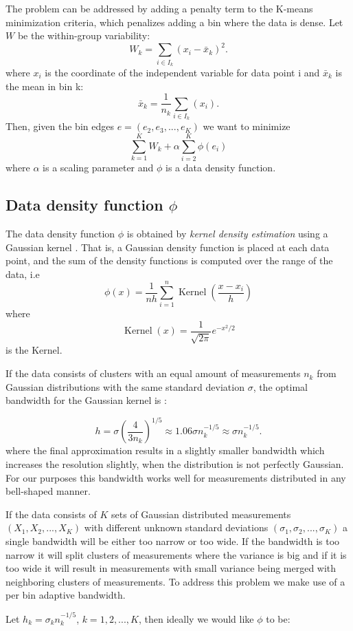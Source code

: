 The problem can be addressed by adding a penalty term to the K-means minimization criteria, which penalizes adding a bin where the data is dense. Let $W$ be the within-group variability:
\begin{equation}
	W_k = \sum_{i \in I_k} (x_i - \bar{x}_k)^2.
\end{equation}
where $x_i$ is the coordinate of the independent variable for data point i and $\bar{x}_k$ is the mean in bin k:
\begin{equation}
	\bar{x}_k = \frac{1}{n_k}\sum_{i \in I_k} (x_i).
\end{equation}
 Then, given the bin edges $e = (e_2, e_3, ..., e_K)$ we want to minimize
\begin{equation}
	\sum_{k=1}^K W_k + \alpha \sum_{i=2}^K \phi (e_i)
	\label{eq:objectiveFunction1}
\end{equation}
where $\alpha$ is a scaling parameter and $\phi$ is a data density function.


\subsection{Data density function $\phi$}
The data density function $\phi$ is obtained by {\em kernel density estimation} using a Gaussian kernel \cite{GaussianKernel}. That is, a Gaussian density function is placed at each data point, and the sum of the density functions is computed over the range of the data, i.e
\begin{equation}
	\phi(x) = \frac{1}{nh} \sum_{i=1}^n \operatorname{Kernel} \left ( \frac{x - x_i}{h} \right )
\end{equation}
where
\begin{equation}
	\operatorname{Kernel}(x) = \frac{1}{\sqrt{2\pi}}e^{-x^2/2}
\end{equation}
is the Kernel.

If the data consists of clusters with an equal amount of measurements $n_k$ from Gaussian distributions with the same standard deviation $\sigma$, the optimal bandwidth for the Gaussian kernel is \cite{GaussianKernel}:

\[
	h = \sigma \left ( \frac{4}{3n_k} \right )^{1/5} \approx 1.06 \sigma n_k^{-1/5} \approx \sigma n_k^{-1/5}.
\]
where the final approximation results in a slightly smaller bandwidth which increases the resolution slightly, when the distribution is not perfectly Gaussian. For our purposes this bandwidth works well for measurements distributed in any bell-shaped manner.
\par
If the data consists of $K$ sets of Gaussian distributed measurements $(X_1, X_2, ..., X_K)$ with different unknown standard deviations $(\sigma_1, \sigma_2, ..., \sigma_K)$ a single bandwidth will be either too narrow or too wide. If the bandwidth is too narrow it will split clusters of measurements where the variance is big and if it is too wide it will result in measurements with small variance being merged with neighboring clusters of measurements. To address this problem we make use of a per bin adaptive bandwidth.
\par
Let $h_k=\sigma_k n_k^{-1/5}$, $k=1,2,...,K$, then ideally we would like $\phi$ to be:

